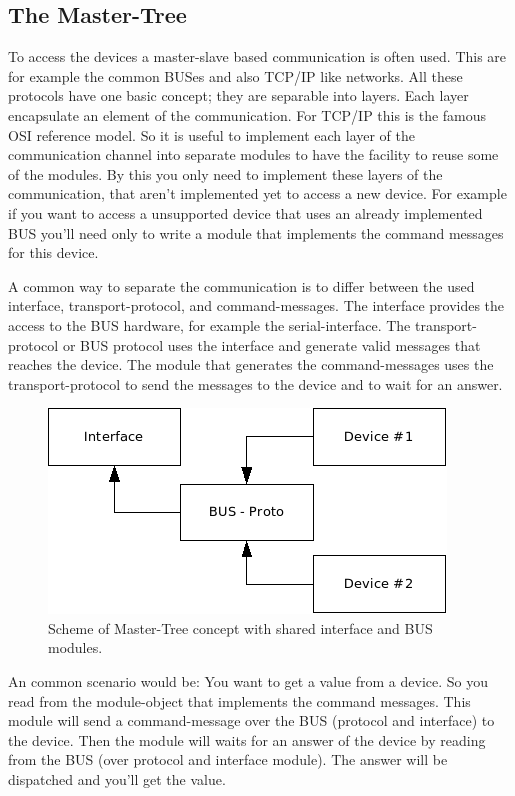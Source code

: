 \subsection{The Master-Tree}
To access the devices a master-slave based communication is often used. This are 
for example the common BUSes and also TCP/IP like networks. All these protocols
have one basic concept; they are separable into layers. Each layer encapsulate 
an element of the communication.  For TCP/IP this is the famous OSI reference 
model. So it is useful to implement each layer of the communication channel
into separate modules to have the facility to reuse some of the modules. By
this you only need to implement these layers of the communication, that aren't
implemented yet to access a new device. For example if you want to access
a unsupported device that uses an already implemented BUS you'll need only
to write a module that implements the command messages for this device.

A common way to separate the communication is to differ between the used
interface, transport-protocol, and command-messages. The interface provides
the access to the BUS hardware, for example the serial-interface. The 
transport-protocol or BUS protocol uses the interface and generate valid 
messages that reaches the device. The module that generates the 
command-messages uses the transport-protocol to send the messages to the
device and to wait for an answer.  

\begin{figure}[ht]
    \centering
    \label{fig:cMasterTree}
    \includegraphics[scale=1]{cMasterTree.png}
    \caption{Scheme of Master-Tree concept with shared interface and BUS modules.}
\end{figure}

An common scenario would be: You want to get a value from a device. So
you read from the module-object that implements the command messages.
This module will send a command-message over the BUS (protocol and interface)
to the device. Then the module will waits for an answer of the device
by reading from the BUS (over protocol and interface module). The
answer will be dispatched and you'll get the value.


